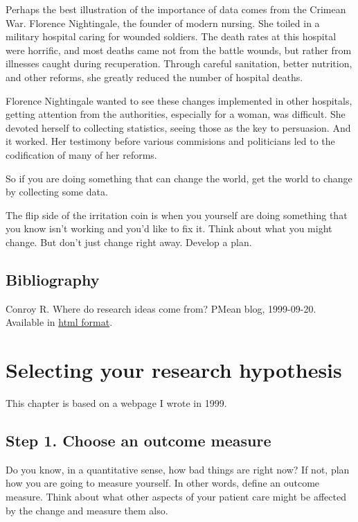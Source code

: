 \documentclass[
  letterpaper,
  DIV=11,
  numbers=noendperiod]{scrreprt}
\begin{document}
Perhaps the best illustration of the importance of data comes from the
Crimean War. Florence Nightingale, the founder of modern nursing. She
toiled in a military hospital caring for wounded soldiers. The death
rates at this hospital were horrific, and most deaths came not from the
battle wounds, but rather from illnesses caught during recuperation.
Through careful sanitation, better nutrition, and other reforms, she
greatly reduced the number of hospital deaths.

Florence Nightingale wanted to see these changes implemented in other
hospitals, getting attention from the authorities, especially for a
woman, was difficult. She devoted herself to collecting statistics,
seeing those as the key to persuasion. And it worked. Her testimony
before various commisions and politicians led to the codification of
many of her reforms.

So if you are doing something that can change the world, get the world
to change by collecting some data.

The flip side of the irritation coin is when you yourself are doing
something that you know isn't working and you'd like to fix it. Think
about what you might change. But don't just change right away. Develop a
plan.

\section{Bibliography}\label{bibliography-1}

Conroy R. Where do research ideas come from? PMean blog, 1999-09-20.
Available in
\href{http://pmean.com/posts/steps-in-developing-research-ideas/}{html
format}.


\chapter{Selecting your research
hypothesis}\label{selecting-your-research-hypothesis}

This chapter is based on a webpage I wrote in 1999.

\section{Step 1. Choose an outcome
measure}\label{step-1.-choose-an-outcome-measure}

Do you know, in a quantitative sense, how bad things are right now? If
not, plan how you are going to measure yourself. In other words, define
an outcome measure. Think about what other aspects of your patient care
might be affected by the change and measure them also.
\end{document}
